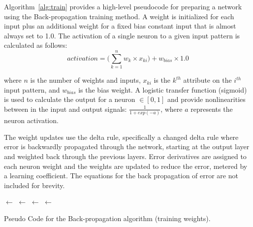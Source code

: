 Algorithm~\ref{alg:train} provides a high-level pseudocode for preparing a network using the Back-propagation training method. A weight is initialized for each input plus an additional weight for a fixed bias constant input that is almost always set to 1.0. The activation of a single neuron to a given input pattern is calculated as follows:
\begin{equation}
	activation = \bigg(\sum_{k=1}^{n} w_{k} \times x_{ki}\bigg) + w_{bias} \times 1.0
\end{equation}

where $n$ is the number of weights and inputs, $x_{ki}$ is the $k^{th}$ attribute on the $i^{th}$ input pattern, and $w_{bias}$ is the bias weight. A logistic transfer function (sigmoid) is used to calculate the output for a neuron $\in [0,1]$ and provide nonlinearities between in the input and output signals: $\frac{1}{1+exp(-a)}$, where $a$ represents the neuron activation. 

The weight updates use the delta rule, specifically a changed delta rule where error is backwardly propagated through the network, starting at the output layer and weighted back through the previous layers. Error derivatives are assigned to each neuron weight and the weights are updated to reduce the error, metered by a learning coefficient. The equations for the back propagation of error are not included for brevity.

\begin{algorithm}[ht]
	\SetLine


	
	\KwIn{\ProblemSize, \InputPatterns, \MaxIterations, \LearningRate}		
	\KwOut{\Network}
  
	\Network $\leftarrow$ \ConstructNetworkLayers{}\;
	\NetworkWeights $\leftarrow$ \InitializeWeights{\Network, \ProblemSize}\;
	 {
		\Pattern $\leftarrow$ \SelectInputPattern{\InputPatterns}\;
		\Output $\leftarrow$ \ForwardPropagate{\Pattern, \Network}\;
		\BackwardPropagateError{\Pattern, \Output, \Network}\;		
		\UpdateWeights{\Pattern, \Output, \Network, \LearningRate}\;
	}
	\Return{\Network}\;
	\caption{Pseudo Code for the Back-propagation algorithm (training weights).}
	\label{alg:train}
\end{algorithm}


